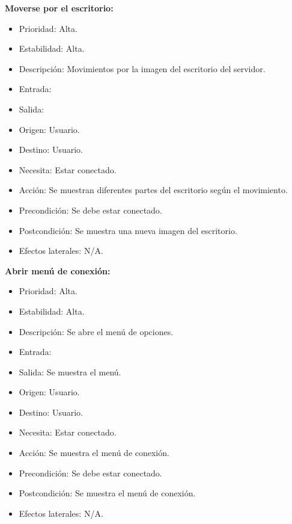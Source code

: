 \textbf{Moverse por el escritorio:}
\begin{itemize}
\item Prioridad: Alta.
\item Estabilidad: Alta.
\item Descripción: Movimientos por la imagen del escritorio del servidor.
\item Entrada:
\item Salida:
\item Origen: Usuario.
\item Destino: Usuario.
\item Necesita: Estar conectado.
\item Acción: Se muestran diferentes partes del escritorio según el movimiento.
\item Precondición: Se debe estar conectado.
\item Postcondición: Se muestra una nueva imagen del escritorio.
\item Efectos laterales: N/A.\\

\end{itemize}
\newpage
\textbf{Abrir menú de conexión:}
\begin{itemize}
\item Prioridad: Alta.
\item Estabilidad: Alta.
\item Descripción: Se abre el menú de opciones.
\item Entrada:
\item Salida: Se muestra el menú.
\item Origen: Usuario.
\item Destino: Usuario.
\item Necesita: Estar conectado.
\item Acción: Se muestra el menú de conexión.
\item Precondición: Se debe estar conectado.
\item Postcondición: Se muestra el menú de conexión.
\item Efectos laterales: N/A.\\

\end{itemize}

